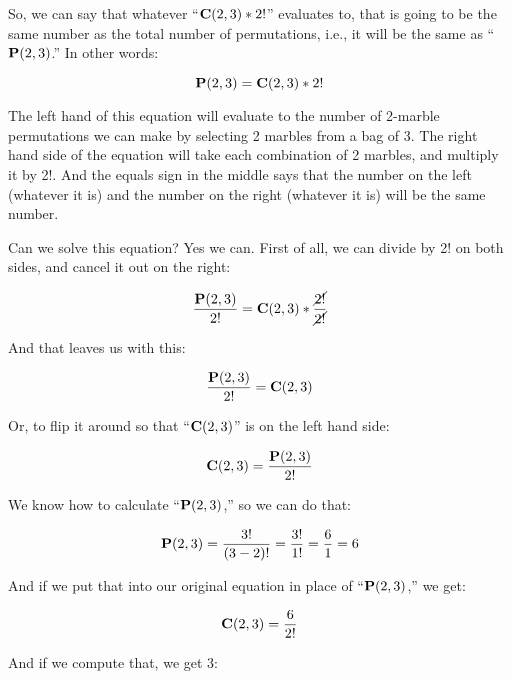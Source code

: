 \documentclass[../../../main.tex]{subfiles}
\begin{document}
So, we can say that whatever ``$\mathbf{C}(2, 3) * 2!$'' evaluates to, that is going to be the same number as the total number of permutations, i.e., it will be the same as ``$\mathbf{P}(2, 3)$.'' In other words:

 \begin{equation*}
  \mathbf{P}(2, 3) = \mathbf{C}(2, 3) * 2!
\end{equation*}

\noindent
The left hand of this equation will evaluate to the number of 2-marble permutations we can make by selecting 2 marbles from a bag of 3. The right hand side of the equation will take each combination of 2 marbles, and multiply it by 2!. And the equals sign in the middle says that the number on the left (whatever it is) and the number on the right (whatever it is) will be the same number.

Can we solve this equation? Yes we can. First of all, we can divide by 2! on both sides, and cancel it out on the right:

\begin{equation*}
  \frac{\mathbf{P}(2, 3)}{2!} = \mathbf{C}(2, 3) * \frac{\cancel{2!}}{\cancel{2!}}
\end{equation*}

\noindent
And that leaves us with this:

\begin{equation*}
  \frac{\mathbf{P}(2, 3)}{2!} = \mathbf{C}(2, 3)
\end{equation*}

\noindent
Or, to flip it around so that ``$\mathbf{C}(2, 3)$'' is on the left hand side:

\begin{equation*}
  \mathbf{C}(2, 3) = \frac{\mathbf{P}(2, 3)}{2!}
\end{equation*}

\noindent
We know how to calculate ``$\mathbf{P}(2, 3)$,'' so we can do that:

\begin{equation*}
  \mathbf{P}(2, 3) = \frac{3!}{(3 - 2)!} = \frac{3!}{1!} = \frac{6}{1} = 6
\end{equation*}

\noindent
And if we put that into our original equation in place of ``$\mathbf{P}(2, 3)$,'' we get:

\begin{equation*}
  \mathbf{C}(2, 3) = \frac{6}{2!}
\end{equation*}

\noindent
And if we compute that, we get 3:
\end{document}

